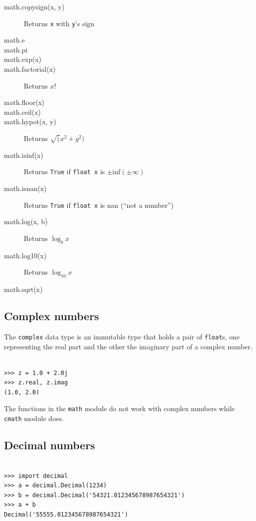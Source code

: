 \begin{description}
\item[math.copysign(x, y)] Returns \verb|x| with \verb|y|'s sign
\item[math.e] 
\item[math.pi] 
\item[math.exp(x)] 
\item[math.factorial(x)] Returns $x!$
\item[math.floor(x)] 
\item[math.ceil(x)] 
\item[math.hypot(x, y)] Returns $\sqrt(x^2 + y^2)$
\item[math.isinf(x)] Returns \verb|True| if \verb|float x| is $\pm \mathrm{inf}(\pm \infty)$
\item[math.isnan(x)] Returns \verb|True| if \verb|float x| is nan (``not a number'')
\item[math.log(x, b)] Returns $\log_bx$
\item[math.log10(x)] Returns $\log_{10}x$
\item[math.sqrt(x)] 
\end{description}




\subsection{Complex numbers}

The \verb|complex| data type is an immutable type that holds a pair of \verb|float|s, one representing the real part and the other the imaginary part of a complex number. 

\begin{lstlisting}

>>> z = 1.0 + 2.0j
>>> z.real, z.imag
(1.0, 2.0)
\end{lstlisting}



The functions in the \verb|math| module do not work with complex numbers while \verb|cmath| module does.



\subsection{Decimal numbers}

\begin{lstlisting}

>>> import decimal
>>> a = decimal.Decimal(1234)
>>> b = decimal.Decimal('54321.012345678987654321')
>>> a + b
Decimal('55555.012345678987654321')
\end{lstlisting}



